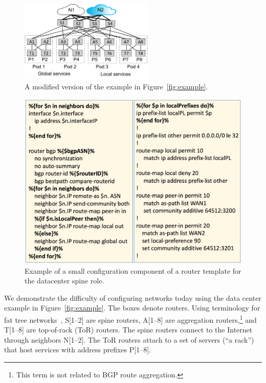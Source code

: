 \documentclass[numbers, 10pt, preprint]{sigplanconf}
\begin{document}
\begin{figure}[t!]
  \centering
  \includegraphics[width=2.5in]{figures/example2}
  \caption{A modified version of the example in Figure~\ref{fig:example}.}
  \label{fig:example2}
  \vspace{-1em}
\end{figure}

\begin{figure}[t!]
  \centering
  \includegraphics[width=\columnwidth]{figures/templates}
  \caption{Example of a small configuration component of a router template for the datacenter spine role.}
  \label{fig:templates}
  \vspace{-1em}
\end{figure}

We demonstrate the difficulty of configuring networks today using the data center example in Figure~\ref{fig:example}. The boxes denote routers. Using terminology for fat tree networks~\cite{fattree}, S[1--2] are spine routers, A[1--8] are aggregation routers,\footnote{This term is not related to BGP route aggregation.} and T[1--8] are top-of-rack (ToR) routers. The spine routers connect to the Internet through neighbors N[1--2].
The ToR routers attach to a set of servers (``a rack'') that host services with address prefixes P[1--8].
\end{document}
